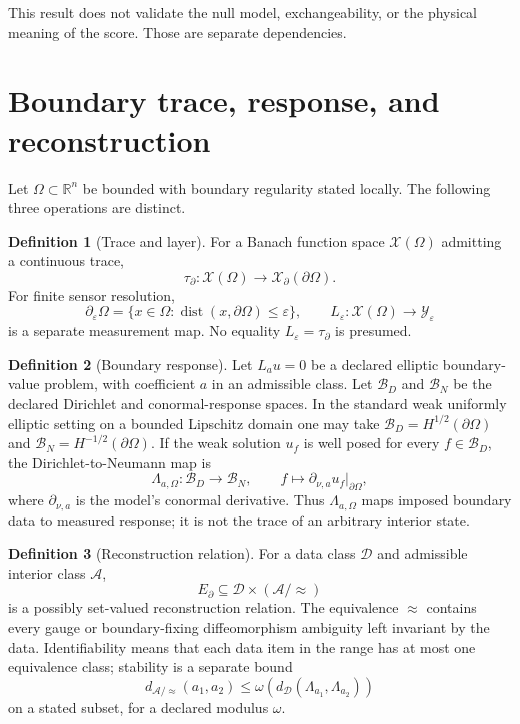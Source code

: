 \documentclass[11pt,a4paper]{article}
\theoremstyle{definition}
\newtheorem{definition}{Definition}[section]
\theoremstyle{plain}
\theoremstyle{remark}
\begin{document}
This result does not validate the null model, exchangeability, or the physical
meaning of the score.  Those are separate dependencies.

\section{Boundary trace, response, and reconstruction}\label{sec:boundary}

Let \(\Omega\subset\mathbb R^n\) be bounded with boundary regularity stated
locally.  The following three operations are distinct.

\begin{definition}[Trace and layer]\label{def:trace}
For a Banach function space \(\mathcal X(\Omega)\) admitting a continuous trace,
\[
\tau_\partial:\mathcal X(\Omega)\to\mathcal X_\partial(\partial\Omega).
\]
For finite sensor resolution,
\[
\partial_\varepsilon\Omega
=\{x\in\Omega:\operatorname{dist}(x,\partial\Omega)\le\varepsilon\},
\qquad
L_\varepsilon:\mathcal X(\Omega)\to\mathcal Y_\varepsilon
\]
is a separate measurement map.  No equality
\(L_\varepsilon=\tau_\partial\) is presumed.
\end{definition}

\begin{definition}[Boundary response]\label{def:dtn}
Let \(L_a u=0\) be a declared elliptic boundary-value problem, with coefficient
\(a\) in an admissible class.  Let \(\mathcal B_D\) and \(\mathcal B_N\) be
the declared Dirichlet and conormal-response spaces.  In the standard weak
uniformly elliptic setting on a bounded Lipschitz domain one may take
\(\mathcal B_D=H^{1/2}(\partial\Omega)\) and
\(\mathcal B_N=H^{-1/2}(\partial\Omega)\).  If the weak solution \(u_f\) is
well posed for every \(f\in\mathcal B_D\), the Dirichlet-to-Neumann map is
\[
\Lambda_{a,\Omega}:\mathcal B_D\to\mathcal B_N,\qquad
f\longmapsto
\partial_{\nu,a}u_f\big|_{\partial\Omega},
\]
where \(\partial_{\nu,a}\) is the model's conormal derivative.  Thus
\(\Lambda_{a,\Omega}\) maps imposed boundary data to measured response; it is
not the trace of an arbitrary interior state.
\end{definition}

\begin{definition}[Reconstruction relation]\label{def:reconstruction}
For a data class \(\mathcal D\) and admissible interior class \(\mathcal A\),
\[
E_\partial\subseteq\mathcal D\times(\mathcal A/{\approx})
\]
is a possibly set-valued reconstruction relation.  The equivalence
\(\approx\) contains every gauge or boundary-fixing diffeomorphism ambiguity
left invariant by the data.  Identifiability means that each data item in the
range has at most one equivalence class; stability is a separate bound
\[
d_{\mathcal A/\approx}(a_1,a_2)
\le\omega\!\left(d_{\mathcal D}(\Lambda_{a_1},\Lambda_{a_2})\right)
\]
on a stated subset, for a declared modulus \(\omega\).
\end{definition}
\end{document}
